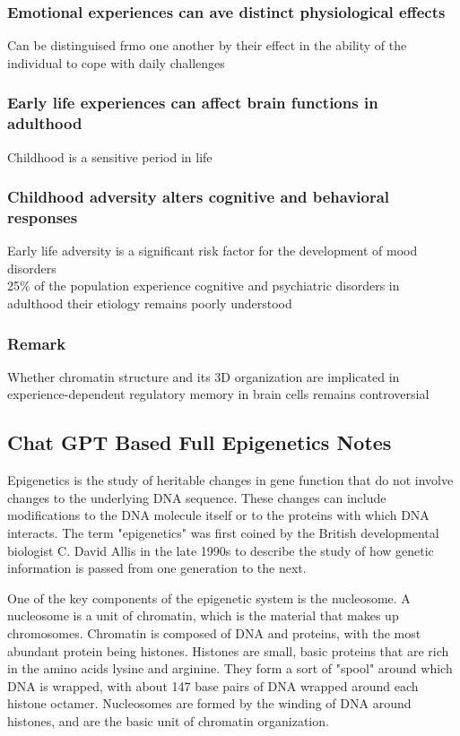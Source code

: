 \begin{itemize}
\begin{itemize}
\subsubsection{Emotional experiences can ave distinct physiological effects}
Can be distinguised frmo one another by their effect in the ability of the individual to cope with daily challenges

\subsubsection{Early life experiences can affect brain functions in adulthood 
}
Childhood is a sensitive period in life

\subsubsection{Childhood adversity alters cognitive and behavioral responses
}
Early life adversity is a significant risk factor for the development of mood disorders 
\\25$\%$ of the population experience cognitive and psychiatric disorders in adulthood  their etiology remains poorly understood 
\subsubsection{Remark}
Whether chromatin structure and its 3D organization 
are implicated in experience-dependent regulatory memory in brain cells remains controversial
\subsection{Chat GPT Based Full Epigenetics Notes}
Epigenetics is the study of heritable changes in gene function that do not involve changes to the underlying DNA sequence. These changes can include modifications to the DNA molecule itself or to the proteins with which DNA interacts. The term "epigenetics" was first coined by the British developmental biologist C. David Allis in the late 1990s to describe the study of how genetic information is passed from one generation to the next.

One of the key components of the epigenetic system is the nucleosome. A nucleosome is a unit of chromatin, which is the material that makes up chromosomes. Chromatin is composed of DNA and proteins, with the most abundant protein being histones. Histones are small, basic proteins that are rich in the amino acids lysine and arginine. They form a sort of "spool" around which DNA is wrapped, with about 147 base pairs of DNA wrapped around each histone octamer. Nucleosomes are formed by the winding of DNA around histones, and are the basic unit of chromatin organization.


\end{itemize}
\end{itemize}
